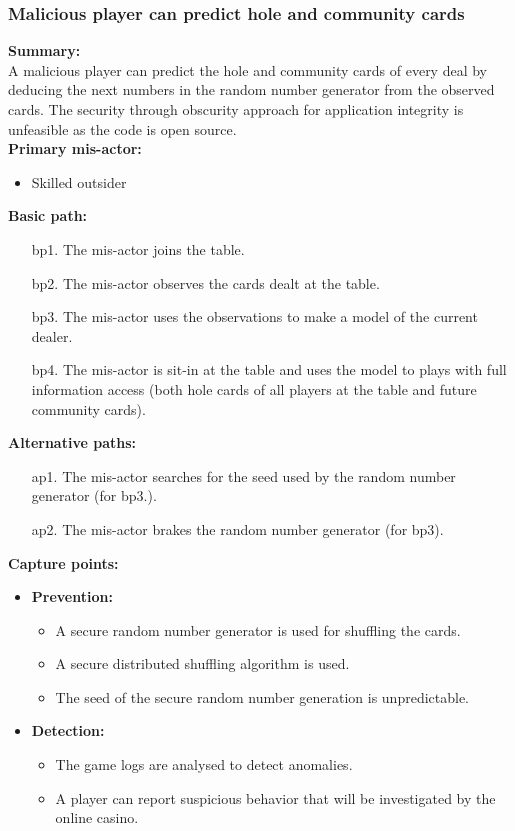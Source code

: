 \documentclass[a4paper,11pt]{report}
\begin{document}
\subsubsection{Malicious player can predict hole and community cards}
\textbf{Summary:} \\
A malicious player can predict the hole and community cards of every deal by deducing the next numbers in the random number generator from the observed cards. The security through obscurity approach for application integrity is unfeasible as the code is open source. \\
\textbf{Primary mis-actor:}
\begin{itemize}
\item Skilled outsider
\end{itemize}
\textbf{Basic path:}
\begin{enumerate}
\item[bp1.] The mis-actor joins the table. 
\item[bp2.] The mis-actor observes the cards dealt at the table.
\item[bp3.] The mis-actor uses the observations to make a model of the current dealer.
\item[bp4.] The mis-actor is sit-in at the table and uses the model to plays with full information access (both hole cards of all players at the table and future community cards).
\end{enumerate}
\textbf{Alternative paths:}
\begin{itemize}
\item[ap1.] The mis-actor searches for the seed used by the random number generator (for bp3.).
\item[ap2.] The mis-actor brakes the random number generator (for bp3).
\end{itemize}
\textbf{Capture points:}
\begin{itemize}
\item \textbf{Prevention:}
\begin{itemize}
\item A secure random number generator is used for shuffling the cards.
\item A secure distributed shuffling algorithm is used.
\item The seed of the secure random number generation is unpredictable.
\end{itemize}
\item \textbf{Detection:}
\begin{itemize}
\item The game logs are analysed to detect anomalies. 
\item A player can report suspicious behavior that will be investigated by the online casino.
\end{itemize}
\end{itemize}
\end{document}
